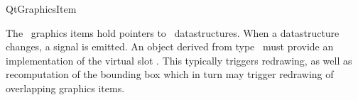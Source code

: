 
\begin{ccRefClass}{QtGraphicsItem}

\ccDefinition
The \cgal\ graphics items hold pointers to \cgal\ datastructures. When a datastructure changes, 
a signal is emitted. An object derived from type \ccRefName\ must provide an implementation of the 
virtual slot .  This typically triggers redrawing, as well as recomputation 
of the bounding box which in turn may trigger redrawing of overlapping graphics items.




\ccInheritsFrom
{}


\end{ccRefClass}








